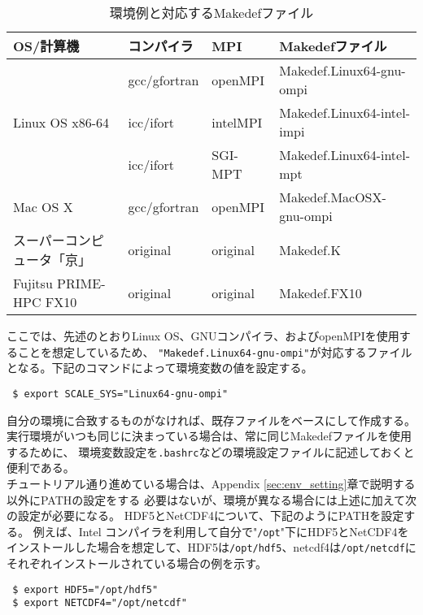 \begin{table}[htb]
\begin{center}
\caption{環境例と対応するMakedefファイル}
\begin{tabularx}{150mm}{|l|l|X|l|} \hline
 \rowcolor[gray]{0.9} OS/計算機 & コンパイラ & MPI & Makedefファイル \\ \hline
              & gcc/gfortran & openMPI & Makedef.Linux64-gnu-ompi \\ \cline{2-4}
 Linux OS x86-64 & icc/ifort & intelMPI & Makedef.Linux64-intel-impi \\ \cline{2-4}
              & icc/ifort    & SGI-MPT & Makedef.Linux64-intel-mpt \\ \hline
 Mac OS X     & gcc/gfortran & openMPI & Makedef.MacOSX-gnu-ompi \\ \hline
 スーパーコンピュータ「京」 & original\footnotemark[1] & original\footnotemark[1] & Makedef.K \\ \hline
 Fujitsu PRIME-HPC FX10   & original\footnotemark[1] & original\footnotemark[1] & Makedef.FX10 \\ \hline
\end{tabularx}
\label{tab:makedef}
\end{center}
\end{table}

ここでは、先述のとおりLinux OS、GNUコンパイラ、およびopenMPIを使用することを想定しているため、
\verb|"Makedef.Linux64-gnu-ompi"|が対応するファイルとなる。下記のコマンドによって環境変数の値を設定する。
\begin{verbatim}
 $ export SCALE_SYS="Linux64-gnu-ompi"
\end{verbatim}
自分の環境に合致するものがなければ、既存ファイルをベースにして作成する。
実行環境がいつも同じに決まっている場合は、常に同じMakedefファイルを使用するために、
環境変数設定を\verb|.bashrc|などの環境設定ファイルに記述しておくと便利である。\\


チュートリアル通り進めている場合は、Appendix \ref{sec:env_setting}章で説明する以外にPATHの設定をする
必要はないが、環境が異なる場合には上述に加えて次の設定が必要になる。
HDF5とNetCDF4について、下記のようにPATHを設定する。
例えば、Intel コンパイラを利用して自分で"\verb|/opt|"下にHDF5とNetCDF4を
インストールした場合を想定して、HDF5は\verb"/opt/hdf5"、netcdf4は\verb|/opt/netcdf|に
それぞれインストールされている場合の例を示す。
\begin{verbatim}
 $ export HDF5="/opt/hdf5"
 $ export NETCDF4="/opt/netcdf"
\end{verbatim}


